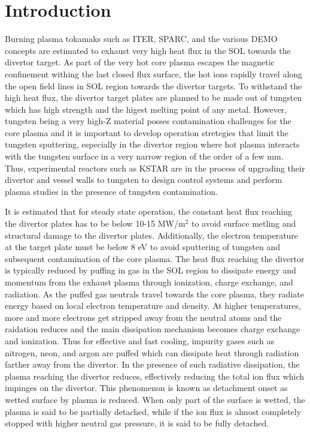 
\section{Introduction}
\label{sec:introduction}

Burning plasma tokamaks such as ITER\cite{Holtkamp_2007_FED}, SPARC\cite{Creely_2020_JPP}, and the various DEMO concepts are estimated to exhaust very high heat flux in the \ac{SOL} towards the divertor target.
As part of the very hot core plasma escapes the magnetic confinement withing the last closed flux surface, the hot ions rapidly travel along the open field lines in \ac{SOL} region towards the divertor targets.
To withstand the high heat flux, the divertor target plates are planned to be made out of tungsten which has high strength and the higest melting point of any metal.
However, tungsten being a very high-Z material posses contamination challenges for the core plasma and it is important to develop operation stretegies that limit the tungsten sputtering, especially in the divertor region where hot plasma interacts with the tungsten surface in a very narrow region of the order of a few mm\cite{Eich_2013_NF}.
Thus, experimental reactors such as KSTAR are in the process of upgrading their divertor and vessel walls to tungsten to design control systems and perform plasma studies in the presence of tungsten contamination.

It is estimated that for steady state operation, the constant heat flux reaching the divertor plates has to be below 10-15 MW/m$^2$\cite{Pitts_2019_NME} to avoid surface metling and structural damage to the divertor plates.
Additionally, the electron temperature at the target plate must be below 8 eV\cite{Brezinsek_2019_NF} to avoid sputtering of tungsten and subsequent contamination of the core plasma.
The heat flux reaching the divertor is typically reduced by puffing in gas in the \ac{SOL} region to dissipate energy and momentum from the exhaust plasma through ionization, charge exchange, and radiation.
As the puffed gas neutrals travel towards the core plasma, they radiate energy based on local electron temperature and density.
At higher temperatures, more and more electrons get stripped away from the neutral atoms and the raidation reduces and the main dissipation mechanism becomes charge exchange and ionization.
Thus for effective and fast cooling, impurity gases such as nitrogen, neon, and argon are puffed which can dissipate heat through radiation farther away from the divertor.
In the presence of such radiative dissipation, the plasma reaching the divertor reduces, effectively reducing the total ion flux which impinges on the divertor.
This phenomenon is known as detachment onset as wetted surface by plasma is reduced.
When only part of the surface is wetted, the plasma is said to be partially detached, while if the ion flux is almost completely stopped with higher neutral gas pressure, it is said to be fully detached.

